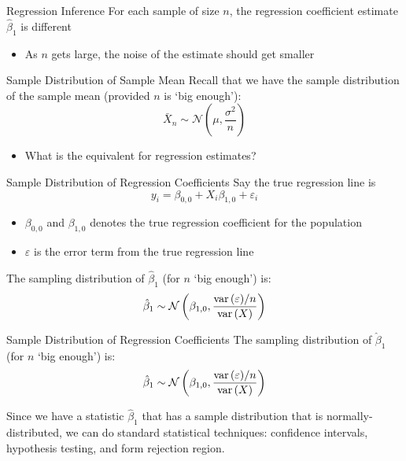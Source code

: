 \documentclass[aspectratio=169,t,11pt,table]{beamer}
\begin{document}
\begin{frame}{Regression Inference}
  For each sample of size $n$, the regression coefficient estimate $\hat{\beta}_1$ is different
  \begin{itemize}
    \item As $n$ gets large, the noise of the estimate should get smaller
  \end{itemize}
\end{frame}

\begin{frame}{Sample Distribution of Sample Mean}
  Recall that we have the sample distribution of the sample mean (provided $n$ is `big enough'):
  $$
    \bar{X}_n \sim \mathcal{N}(\mu, \frac{\sigma^2}{n})
  $$
  \begin{itemize}
    \item What is the equivalent for regression estimates?
  \end{itemize}
\end{frame}

\begin{frame}{Sample Distribution of Regression Coefficients}
  Say the true regression line is 
  $$
      y_i = \beta_{0,0} + X_i \beta_{1,0} + \varepsilon_i
  $$
  \begin{itemize}
    \item $\beta_{0,0}$ and $\beta_{1,0}$ denotes the true regression coefficient for the population
    
    \item $\varepsilon$ is the error term from the true regression line 
  \end{itemize}

  \pause
  \bigskip
  The sampling distribution of $\hat{\beta}_1$ (for $n$ `big enough') is:
  $$
    \hat{\beta}_1 \sim 
    \mathcal{N}\left( 
      \beta_{1, 0}, \frac{ \var{\varepsilon} / n }{\var{X}} 
    \right)
  $$
\end{frame}

\begin{frame}{Sample Distribution of Regression Coefficients}
  The sampling distribution of $\hat{\beta}_1$ (for $n$ `big enough') is:
  $$
    \hat{\beta}_1 \sim 
    \mathcal{N}\left( 
      \beta_{1, 0}, \frac{ \var{\varepsilon} / n }{\var{X}} 
    \right)
  $$

  \bigskip
  Since we have a statistic $\hat{\beta}_1$ that has a sample distribution that is normally-distributed, we can do standard statistical techniques: confidence intervals, hypothesis testing, and form rejection region.  
\end{frame}
\end{document}
